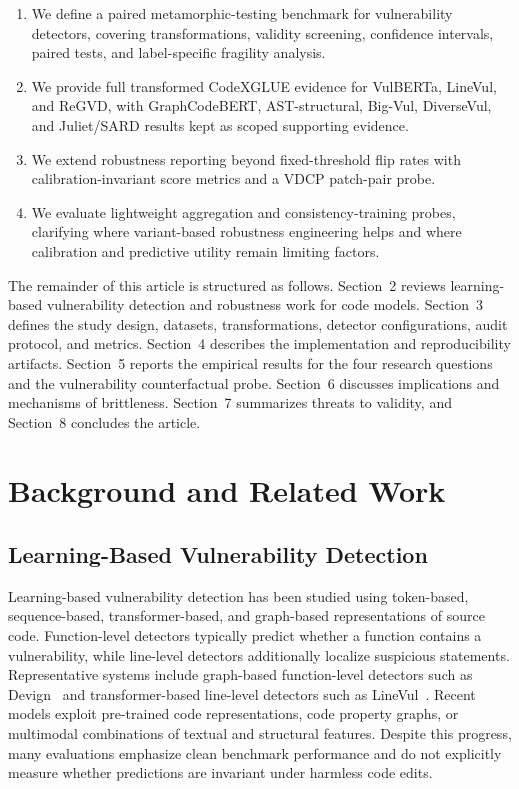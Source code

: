 \documentclass[a4paper,fleqn]{cas-dc}
\begin{document}
\begin{enumerate}
  \item We define a paired metamorphic-testing benchmark for vulnerability
  detectors, covering transformations, validity screening, confidence
  intervals, paired tests, and label-specific fragility analysis.
  \item We provide full transformed CodeXGLUE evidence for VulBERTa, LineVul,
  and ReGVD, with GraphCodeBERT, AST-structural, Big-Vul, DiverseVul, and
  Juliet/SARD results kept as scoped supporting evidence.
  \item We extend robustness reporting beyond fixed-threshold flip rates with
  calibration-invariant score metrics and a VDCP patch-pair probe.
  \item We evaluate lightweight aggregation and consistency-training probes,
  clarifying where variant-based robustness engineering helps and where
  calibration and predictive utility remain limiting factors.
\end{enumerate}

The remainder of this article is structured as follows. Section~2 reviews
learning-based vulnerability detection and robustness work for code models.
Section~3 defines the study design, datasets, transformations, detector
configurations, audit protocol, and metrics. Section~4 describes the
implementation and reproducibility artifacts. Section~5 reports the empirical
results for the four research questions and the vulnerability counterfactual
probe. Section~6 discusses implications and
mechanisms of brittleness. Section~7 summarizes threats to validity, and
Section~8 concludes the article.

\section{Background and Related Work}

\subsection{Learning-Based Vulnerability Detection}

Learning-based vulnerability detection has been studied using token-based,
sequence-based, transformer-based, and graph-based representations of source
code. Function-level detectors typically predict whether a function contains a
vulnerability, while line-level detectors additionally localize suspicious
statements. Representative systems include graph-based function-level
detectors such as Devign~\cite{zhou2019devign} and transformer-based
line-level detectors such as LineVul~\cite{fu2022linevul}. Recent models
exploit pre-trained code representations, code property graphs, or multimodal
combinations of textual and structural features. Despite this progress, many
evaluations emphasize clean benchmark performance and do not explicitly measure
whether predictions are invariant under harmless code edits.
\end{document}
